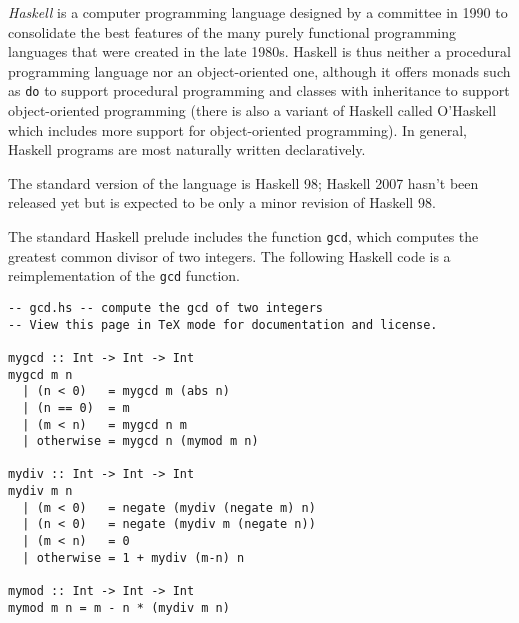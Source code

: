 \documentclass[12pt]{article}
\begin{document}
{\em Haskell} is a computer programming language designed by a committee in 1990 to consolidate the best features of the many purely functional programming languages that were created in the late 1980s.  Haskell is thus neither a procedural programming language nor an object-oriented one, although it offers monads such as {\tt do} to support procedural programming and classes with inheritance to support object-oriented programming (there is also a variant of Haskell called O'Haskell which includes more support for object-oriented programming).  In general, Haskell programs are most naturally written declaratively.

The standard version of the language is Haskell 98; Haskell 2007 hasn't been released yet but is expected to be only a minor revision of Haskell 98.

The standard Haskell prelude includes the function {\tt gcd}, which computes the greatest common divisor of two integers.  The following Haskell code is a reimplementation of the {\tt gcd} function.

%
%
%
% 
%

\begin{verbatim}
-- gcd.hs -- compute the gcd of two integers
-- View this page in TeX mode for documentation and license.

mygcd :: Int -> Int -> Int
mygcd m n
  | (n < 0)   = mygcd m (abs n)
  | (n == 0)  = m
  | (m < n)   = mygcd n m
  | otherwise = mygcd n (mymod m n)

mydiv :: Int -> Int -> Int
mydiv m n
  | (m < 0)   = negate (mydiv (negate m) n)
  | (n < 0)   = negate (mydiv m (negate n))
  | (m < n)   = 0
  | otherwise = 1 + mydiv (m-n) n

mymod :: Int -> Int -> Int
mymod m n = m - n * (mydiv m n)
\end{verbatim}
\end{document}
